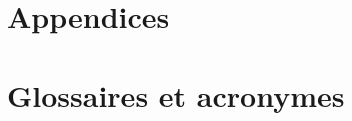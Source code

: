 \chapter{Appendices} \label{appendix:example}
\listoffigures
\listoftables

\chapter{Glossaires et acronymes} \label{appendix:glossaries}
\glsaddall
\printglossary
\printglossary[type=\acronymtype]
